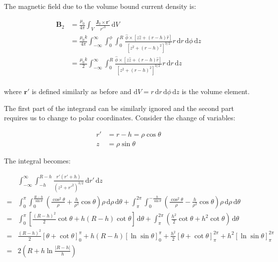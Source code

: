 \documentclass[12pt]{article}
\begin{document}
The magnetic field due to the volume bound current density is:

\begin{equation}
\begin{split}
    \mathbf{B}_{2} &= \frac{\mu_{0}}{4\pi} \int_{V} \frac{\mathbf{J}_{b} \times \mathbf{r}'}{r'^{3}} \, \mathrm{d}V \\
    &= \frac{\mu_{0}k}{4\pi} \int_{-\infty}^{\infty} \int_{0}^{\phi} \int_{0}^{R} \frac{\hat{\phi} \times [z \hat{z} + (r-h) \hat{r}]}{[z^{2} + (r-h)^{2}]^{3/2}} r \, \mathrm{d}r \, \mathrm{d}\phi \, \mathrm{d}z \\
    &= \frac{\mu_{0}k}{2} \int_{-\infty}^{\infty} \int_{0}^{R} \frac{\hat{\phi} \times [z \hat{z} + (r-h) \hat{r}]}{[z^{2} + (r-h)^{2}]^{3/2}} r \, \mathrm{d}r \, \mathrm{d}z \\
\end{split}
\end{equation}

where $\mathbf{r}'$ is defined similarly as before and $\mathrm{d}V = r \, \mathrm{d}r \, \mathrm{d}\phi \, \mathrm{d}z$ is the volume element.

The first part of the integrand can be similarly ignored and the second part requires us to change to polar coordinates. Consider the change of variables:

\begin{equation}
\begin{split}
    r' &= r - h = \rho \cos{\theta} \\
    z &= \rho \sin{\theta}
\end{split}
\end{equation}

The integral becomes:

\begin{equation}
\begin{split}
    &\int_{-\infty}^{\infty} \int_{-h}^{R-h} \frac{r'(r'+h)}{(z^{2} + r'^{2})^{3/2}} \, \mathrm{d}r' \, \mathrm{d}z \\
    = &\int_{0}^{\pi} \int_{0}^{\frac{R-h}{\sin{\theta}}} \left( \frac{\cos^{2}{\theta}}{\rho} + \frac{h}{\rho^{2}} \cos{\theta} \right) \rho \, \mathrm{d}\rho \, \mathrm{d}\theta + \int_{\pi}^{2\pi} \int_{0}^{-\frac{h}{\sin{\theta}}} \left( \frac{\cos^{2}{\theta}}{\rho} - \frac{h}{\rho^{2}} \cos{\theta} \right) \rho \, \mathrm{d}\rho \, \mathrm{d}\theta \\
    = &\int_{0}^{\pi} \left[ \frac{(R-h)^{2}}{2} \cot{\theta} + h(R - h) \cot{\theta} \right] \, \mathrm{d}\theta + \int_{\pi}^{2\pi} \left( \frac{h^{2}}{2} \cot{\theta} + h^{2} \cot{\theta} \right) \, \mathrm{d}\theta \\
    = &\frac{(R-h)^{2}}{2} \left[ \theta + \cot{\theta} \right]_{0}^{\pi} + h(R - h) \left[ \ln{\sin{\theta}} \right]_{0}^{\pi} + \frac{h^{2}}{2} \left[ \theta + \cot{\theta} \right]_{\pi}^{2\pi} + h^{2} \left[ \ln{\sin{\theta}} \right]_{\pi}^{2\pi} \\
    = &2\left( R + h \ln{\frac{\left\lvert R-h \right\rvert}{h}} \right)
\end{split}
\end{equation}
\end{document}
